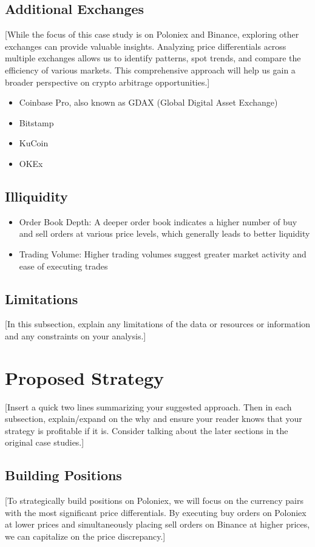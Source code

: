 \documentclass{article}
\begin{document}
\subsection{Additional Exchanges}
[While the focus of this case study is on Poloniex and Binance, exploring other exchanges can provide valuable
insights. Analyzing price differentials across multiple exchanges allows us to identify patterns, spot trends,
and compare the efficiency of various markets. This comprehensive approach will help us gain a broader
perspective on crypto arbitrage opportunities.]
\begin{itemize}
  \item Coinbase Pro, also known as GDAX (Global Digital Asset Exchange)
  \item Bitstamp
  \item KuCoin
  \item OKEx
\end{itemize}
\subsection{Illiquidity}
\begin{itemize}
  \item Order Book Depth: A deeper order book indicates a higher number of buy and sell orders at various price levels, which generally leads to better liquidity
  \item Trading Volume: Higher trading volumes suggest greater market activity and ease of executing trades
\end{itemize}
\subsection{Limitations}
[In this subsection, explain any limitations of the data or resources or information and any constraints on your analysis.]

\section{Proposed Strategy}
[Insert a quick two lines summarizing your suggested approach. Then in each subsection, explain/expand on the why and ensure your reader knows that your strategy is profitable if it is. Consider talking about the later sections in the original case studies.]
\subsection{Building Positions}
[To strategically build positions on Poloniex, we will focus on the currency pairs with the most significant price differentials. By executing buy orders on Poloniex at lower prices and simultaneously placing sell orders on Binance at higher prices, we can capitalize on the price discrepancy.]
\end{document}
